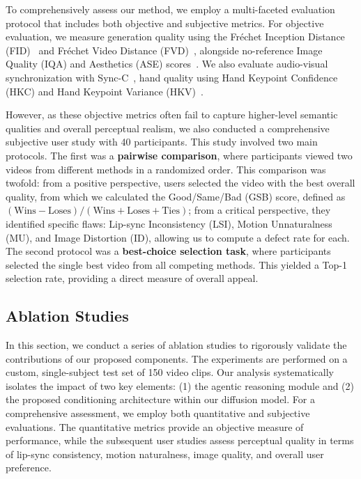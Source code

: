 To comprehensively assess our method, we employ a multi-faceted evaluation protocol that includes both objective and subjective metrics.
For objective evaluation, we measure generation quality using the Fr\'echet Inception Distance (FID)~\cite{heusel2017gans} and Fr\'echet Video Distance (FVD)~\cite{unterthiner2019fvd}, alongside no-reference Image Quality (IQA) and Aesthetics (ASE) scores~\cite{wu2023q}. We also evaluate audio-visual synchronization with Sync-C~\cite{syncnet}, hand quality using Hand Keypoint Confidence (HKC) and Hand Keypoint Variance (HKV)~\cite{lin2025cyberhost}.
\par
However, as these objective metrics often fail to capture higher-level semantic qualities and overall perceptual realism, we also conducted a comprehensive subjective user study with 40 participants. This study involved two main protocols. The first was a \textbf{pairwise comparison}, where participants viewed two videos from different methods in a randomized order. This comparison was twofold: from a positive perspective, users selected the video with the best overall quality, from which we calculated the Good/Same/Bad (GSB) score, defined as $(\text{Wins} - \text{Loses}) / (\text{Wins} + \text{Loses} + \text{Ties})$; from a critical perspective, they identified specific flaws: Lip-sync Inconsistency (LSI), Motion Unnaturalness (MU), and Image Distortion (ID), allowing us to compute a defect rate for each. The second protocol was a \textbf{best-choice selection task}, where participants selected the single best video from all competing methods. This yielded a Top-1 selection rate, providing a direct measure of overall appeal.



\subsection{Ablation Studies}
In this section, we conduct a series of ablation studies to rigorously validate the contributions of our proposed components. The experiments are performed on a custom, single-subject test set of 150 video clips. Our analysis systematically isolates the impact of two key elements: (1) the agentic reasoning module and (2) the proposed conditioning architecture within our diffusion model. For a comprehensive assessment, we employ both quantitative and subjective evaluations. The quantitative metrics provide an objective measure of performance, while the subsequent user studies assess perceptual quality in terms of lip-sync consistency, motion naturalness, image quality, and overall user preference.

